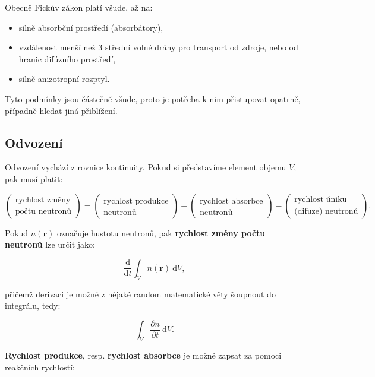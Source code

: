 Obecně Fickův zákon platí všude, až na:

\begin{itemize}
    \item silně absorbční prostředí (absorbátory),
    \item vzdálenost menší než 3 střední volné dráhy pro transport od zdroje, nebo od hranic difúzního prostředí,
    \item silně anizotropní rozptyl.
\end{itemize}

Tyto podmínky jsou částečně všude, proto je potřeba k nim přistupovat opatrně, případně hledat jiná přiblížení.

\subsection{Odvození}

Odvození vychází z rovnice kontinuity. Pokud si představíme element objemu $V$, pak musí platit:

\begin{equation*}
    \boxed{
    \begin{pmatrix} \text{rychlost změny} \\ \text{počtu neutronů} \end{pmatrix} = \begin{pmatrix} \text{rychlost produkce} \\ \text{neutronů} \end{pmatrix} - \begin{pmatrix} \text{rychlost absorbce} \\ \text{neutronů} \end{pmatrix} - \begin{pmatrix} \text{rychlost úniku} \\ \text{(difuze) neutronů} \end{pmatrix}.
    }
\end{equation*}

Pokud $n(\textbf{r})$ označuje hustotu neutronů, pak \textbf{rychlost změny počtu neutronů} lze určit jako:

$$ \dfrac{\text{d}}{\text{d}t} \int_V n(\textbf{r}) \: \text{d} V, $$

přičemž derivaci je možné z nějaké random matematické věty šoupnout do integrálu, tedy:

$$ \boxed{\int_V \dfrac{\partial n}{\partial t} \: \text{d} V.} $$

\textbf{Rychlost produkce}, resp. \textbf{rychlost absorbce} je možné zapsat za pomoci reakčních rychlostí:

